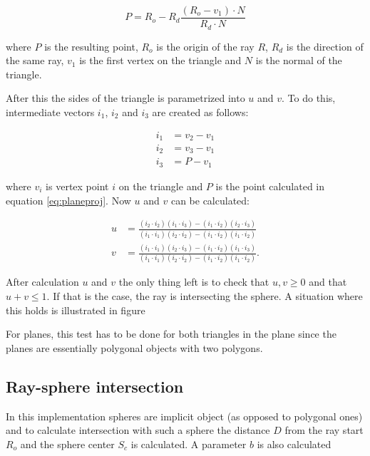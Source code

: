 \documentclass[a4paper]{report}
\begin{document}
\begin{equation}
  P = R_o - R_d\frac{(R_o-v_1) \cdot N}{R_d \cdot N}
  \label{eq:planeproj}
\end{equation}

where \(P\) is the resulting point, \(R_o\) is the origin of the ray
\(R\), \(R_d\) is the direction of the same ray, \(v_1\) is the first
vertex on the triangle and \(N\) is the normal of the triangle.

After this the sides of the triangle is parametrized into \(u\) and
\(v\). To do this, intermediate vectors \(i_1\), \(i_2\) and \(i_3\)
are created as follows:

\begin{align}
  i_1 &= v_2 - v_1 \nonumber \\
  i_2 &= v_3 - v_1 \nonumber \\
  i_3 &= P - v_1
  \label{eq:intermediate}
\end{align}

where \(v_i\) is vertex point \(i\) on the triangle and \(P\) is the point calculated
in equation \ref{eq:planeproj}. Now \(u\) and \(v\) can be calculated:

\begin{align}
  u &= \frac{(i_2 \cdot i_2)(i_1 \cdot i_3) - (i_1 \cdot i_2)(i_2
    \cdot i_3)}{(i_1 \cdot i_1)(i_2 \cdot i_2) - (i_1 \cdot i_2)(i_1
    \cdot i_2)} \nonumber \\
  v &= \frac{(i_1 \cdot i_1)(i_2 \cdot i_3) - (i_1 \cdot i_2)(i_1
    \cdot i_3)}{(i_1 \cdot i_1)(i_2 \cdot i_2) - (i_1 \cdot i_2)(i_1
    \cdot i_2)}.
  \label{eq:uandv}
\end{align}

After calculation \(u\) and \(v\) the only thing left is to check that
\(u,v \geq 0\) and that \(u+v \leq 1\). If that is the case, the ray
is intersecting the sphere. A situation where this holds is
illustrated in figure %

For planes, this test has to be done for both triangles in the plane
since the planes are essentially polygonal objects with two polygons.

\subsection{Ray-sphere intersection}

In this implementation spheres are implicit object (as opposed to
polygonal ones) and to calculate intersection with such a sphere the
distance \(D\) from the ray start \(R_o\) and the sphere center \(S_c\) is
calculated. A parameter \(b\) is also calculated 
\end{document}
